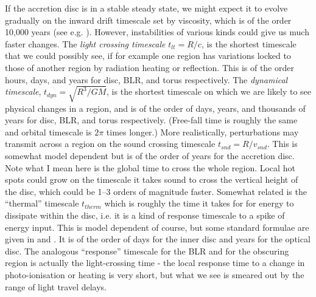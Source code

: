 \documentclass[11pt]{article}
\begin{document}
If the accretion disc is in a stable steady state, we might expect it to evolve gradually on the inward drift timescale set by viscosity, which is of the order 10,000 years (see e.g. \citet{Netzer2013}). However, instabilities of various kinds could give us much faster changes. The {\em light crossing timescale} $t_{lt}=R/c$, is the shortest timescale that we could possibly see, if for example one region has variations locked to those of another region by radiation heating or reflection. This is of the order hours, days, and years for disc, BLR, and torus respectively. The {\em dynamical timescale}, $t_{dyn}=\sqrt{R^3/GM}$, is the shortest timescale on which we are likely to see physical changes in a region, and is of the order of days, years, and thousands of years for disc, BLR, and torus respectively. (Free-fall time is roughly the same and orbital timescale is $2\pi$ times longer.) More realistically, perturbations may transmit across a region on the sound crossing timescale $t_{snd}= R/ v_{snd}$. This is somewhat model dependent but is of the order of years for the accretion disc. Note what I mean here is the global time to cross the whole region. Local hot spots could grow on the timescale it takes sound to cross the vertical height of the disc, which could be 1--3 orders of magnitude faster. Somewhat related is the ``thermal'' timescale $t_{therm}$ which is roughly the time it takes for for energy to dissipate within the disc, i.e. it is a kind of response timescale to a spike of energy input. This is model dependent of course, but some standard formulae are given in \citet{Collier2001a} and \citet{Kelly2009}. It is of the order of days for the inner disc and years for the optical disc.  The analogous ``response'' timescale for the BLR and for the obscuring region is actually the light-crossing time - the local response time to a change in photo-ionisation or heating is very short, but what we see is smeared out by the range of light travel delays.
\end{document}
